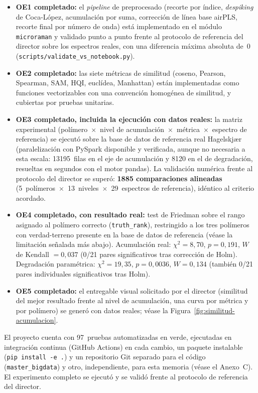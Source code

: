 \begin{itemize}
    \item \textbf{OE1 completado:} el \textit{pipeline} de preprocesado (recorte por índice, \textit{despiking} de Coca-López, acumulación por suma, corrección de línea base airPLS, recorte final por número de onda) está implementado en el módulo \texttt{microraman} y validado punto a punto frente al protocolo de referencia del director sobre los espectros reales, con una diferencia máxima absoluta de~0 (\texttt{scripts/validate\_vs\_notebook.py}).
    \item \textbf{OE2 completado:} las siete métricas de similitud (coseno, Pearson, Spearman, SAM, HQI, euclídea, Manhattan) están implementadas como funciones vectorizables con una convención homogénea de similitud, y cubiertas por pruebas unitarias.
    \item \textbf{OE3 completado, incluida la ejecución con datos reales:} la matriz experimental (polímero~$\times$~nivel de acumulación~$\times$~métrica~$\times$~espectro de referencia) se ejecutó sobre la base de datos de referencia real Hagelskjær (paralelización con PySpark disponible y verificada, aunque no necesaria a esta escala: 13195~filas en el eje de acumulación y 8120 en el de degradación, resueltas en segundos con el motor pandas). La validación numérica frente al protocolo del director se superó: \textbf{1885 comparaciones alineadas} (5~polímeros~$\times$~13~niveles~$\times$~29~espectros de referencia), idéntico al criterio acordado.
    \item \textbf{OE4 completado, con resultado real:} test de Friedman sobre el rango asignado al polímero correcto (\texttt{truth\_rank}), restringido a los tres polímeros con verdad-terreno presente en la base de datos de referencia (véase la limitación señalada más abajo). Acumulación real: $\chi^2=8{,}70$, $p=0{,}191$, $W$ de Kendall $=0{,}037$ (0/21 pares significativos tras corrección de Holm). Degradación paramétrica: $\chi^2=19{,}35$, $p=0{,}0036$, $W=0{,}134$ (también 0/21 pares individuales significativos tras Holm).
    \item \textbf{OE5 completado:} el entregable visual solicitado por el director (similitud del mejor resultado frente al nivel de acumulación, una curva por métrica y por polímero) se generó con datos reales; véase la Figura~\ref{fig:similitud-acumulacion}.
\end{itemize}

El proyecto cuenta con 97~pruebas automatizadas en verde, ejecutadas en integración continua (GitHub Actions) en cada cambio, un paquete instalable (\texttt{pip install -e .}) y un repositorio Git separado para el código (\texttt{master\_bigdata}) y otro, independiente, para esta memoria (véase el Anexo~C). El experimento completo se ejecutó y se validó frente al protocolo de referencia del director.

